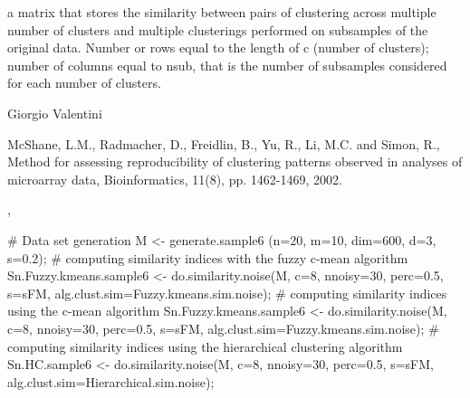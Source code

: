\documentclass{article}
\begin{document}
\begin{Value}
a matrix that stores the similarity between pairs of clustering across multiple number of clusters
and multiple clusterings performed on subsamples of the original data.
Number or rows equal to the length of c (number of clusters); number of columns      
equal to nsub, that is the number of subsamples considered for each number of clusters.
\end{Value}
\begin{Author}\relax
Giorgio Valentini 
\end{Author}
\begin{References}\relax
McShane, L.M., Radmacher, D., Freidlin, B., Yu, R.,  Li, M.C. and Simon, R.,
Method for assessing reproducibility of clustering patterns observed in analyses of microarray data,
Bioinformatics, 11(8), pp. 1462-1469, 2002.
\end{References}
\begin{SeeAlso}\relax
{}, 
\end{SeeAlso}
\begin{Examples}
\begin{ExampleCode}
# Data set generation
M <- generate.sample6 (n=20, m=10, dim=600, d=3, s=0.2);
# computing similarity indices with the fuzzy c-mean algorithm
Sn.Fuzzy.kmeans.sample6 <- do.similarity.noise(M, c=8, nnoisy=30, perc=0.5, s=sFM, 
                                      alg.clust.sim=Fuzzy.kmeans.sim.noise);
# computing similarity indices using the c-mean algorithm
Sn.Fuzzy.kmeans.sample6 <- do.similarity.noise(M, c=8, nnoisy=30, perc=0.5, s=sFM, 
                                      alg.clust.sim=Fuzzy.kmeans.sim.noise);
# computing similarity indices using the hierarchical clustering algorithm
Sn.HC.sample6 <- do.similarity.noise(M, c=8, nnoisy=30, perc=0.5, s=sFM, 
                                      alg.clust.sim=Hierarchical.sim.noise);
\end{ExampleCode}
\end{Examples}
\end{document}
